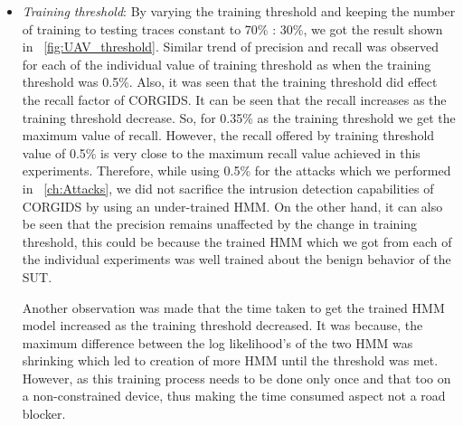 \begin{itemize}

\item \textit{Training threshold}: By varying the training threshold and keeping the number of training to testing traces constant to 70\% : 30\%, we got the result shown in ~\autoref{fig:UAV_threshold}. Similar trend of precision and recall was observed for each of the individual value of training threshold as when the training threshold was 0.5\%. Also, it was seen that the training threshold did effect the recall factor of \ac{CORGIDS}. It can be seen that the recall increases as the training threshold decrease. So, for 0.35\% as the training threshold we get the maximum value of recall. However, the recall offered by training threshold value of 0.5\% is very close to the maximum recall value achieved in this experiments. Therefore, while using 0.5\% for the attacks which we performed in ~\autoref{ch:Attacks}, we did not sacrifice the intrusion detection capabilities of \ac{CORGIDS} by using an under-trained \ac{HMM}. On the other hand, it can also be seen that the precision remains unaffected by the change in training threshold, this could be because the trained \ac{HMM} which we got from each of the individual experiments was well trained about the benign behavior of the \ac{SUT}.

Another observation was made that the time taken to get the trained \ac{HMM} model increased as the training threshold decreased. It was because, the maximum difference between the log likelihood's of the two \ac{HMM} was shrinking which led to creation of more \ac{HMM} until the threshold was met. However, as this training process needs to be done only once and that too on a non-constrained device, thus making the time consumed aspect not a road blocker.

\end{itemize}
